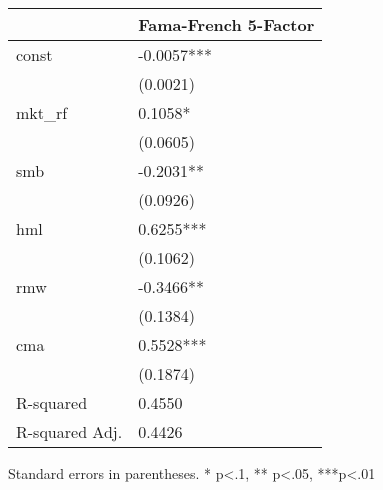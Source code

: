 \begin{table}
\caption{}
\label{}
\begin{center}
\begin{tabular}{ll}
\hline
               & Fama-French 5-Factor  \\
\hline
const          & -0.0057***            \\
               & (0.0021)              \\
mkt\_rf        & 0.1058*               \\
               & (0.0605)              \\
smb            & -0.2031**             \\
               & (0.0926)              \\
hml            & 0.6255***             \\
               & (0.1062)              \\
rmw            & -0.3466**             \\
               & (0.1384)              \\
cma            & 0.5528***             \\
               & (0.1874)              \\
R-squared      & 0.4550                \\
R-squared Adj. & 0.4426                \\
\hline
\end{tabular}
\end{center}
\end{table}
\bigskip
Standard errors in parentheses. \newline 
* p<.1, ** p<.05, ***p<.01